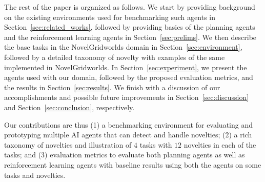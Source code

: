 \documentclass[sigconf]{aamas}
\begin{document}
The rest of the paper is organized as follows. We start by providing background on the existing environments used for benchmarking such agents in Section~\ref{sec:related_works}, followed by providing basics of the planning agents and the reinforcement learning agents in Section~\ref{sec:prelims}. We then describe the base tasks in the NovelGridworlds domain in Section~\ref{sec:environment}, followed by a detailed taxonomy of novelty with examples of the same implemented in NovelGridworlds. In Section~\ref{sec:experiment}, we present the agents used with our domain, followed by the proposed evaluation metrics, and the results in Section~\ref{sec:results}.  We finish with a discussion of our accomplishments and possible future improvements in Section~\ref{sec:discussion} and Section~\ref{sec:conclusion}, respectively.

Our contributions are thus (1) a benchmarking environment for evaluating and prototyping multiple AI agents that can detect and handle novelties; (2) a rich taxonomy of novelties and illustration of $4$ tasks with $12$ novelties in each of the tasks; and (3) evaluation metrics to evaluate both planning agents as well as reinforcement learning agents with baseline results using both the agents on some tasks and novelties. 




\end{document}
